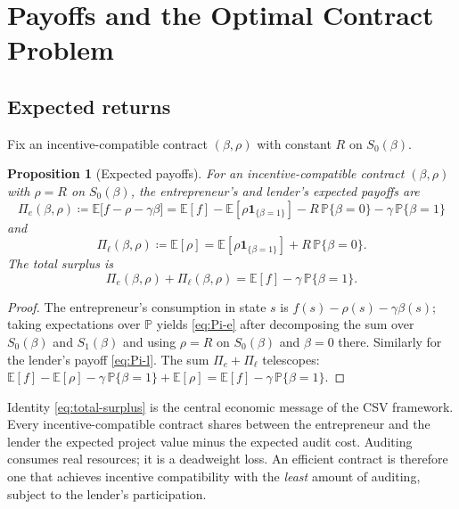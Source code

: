 \documentclass[11pt,a4paper,oneside]{book}
\def\E{\mathbb{E}}
\def\1{\mathbf{1}}
\renewcommand{\P}{\mathbb{P}}
\theoremstyle{plain}
\newtheorem{proposition}[theorem]{Proposition}
\theoremstyle{definition}
\theoremstyle{remark}
\numberwithin{equation}{chapter}
\begin{document}
\section{Payoffs and the Optimal Contract Problem}
\label{sec:GH-payoffs}

\subsection{Expected returns}

Fix an incentive-compatible contract $(\beta, \rho)$ with constant $R$ on $S_0(\beta)$.

\begin{proposition}[Expected payoffs]\label{prop:GH-payoffs}
For an incentive-compatible contract $(\beta, \rho)$ with $\rho = R$ on $S_0(\beta)$, the entrepreneur's and lender's expected payoffs are
\begin{equation}\label{eq:Pi-e}
  \Pi_e(\beta, \rho)
  \coloneqq \E\bigl[ f - \rho - \gamma \beta \bigr]
  = \E[f] - \E[\rho \1_{\{\beta = 1\}}] - R \,\P\{\beta = 0\} - \gamma \,\P\{\beta = 1\}
\end{equation}
and
\begin{equation}\label{eq:Pi-l}
  \Pi_\ell(\beta, \rho)
  \coloneqq \E[\rho]
  = \E[\rho \1_{\{\beta = 1\}}] + R \,\P\{\beta = 0\}.
\end{equation}
The total surplus is
\begin{equation}\label{eq:total-surplus}
  \Pi_e(\beta, \rho) + \Pi_\ell(\beta, \rho) = \E[f] - \gamma \, \P\{\beta = 1\}.
\end{equation}
\end{proposition}

\begin{proof}
The entrepreneur's consumption in state $s$ is $f(s) - \rho(s) - \gamma \beta(s)$; taking expectations over $\P$ yields \eqref{eq:Pi-e} after decomposing the sum over $S_0(\beta)$ and $S_1(\beta)$ and using $\rho = R$ on $S_0(\beta)$ and $\beta = 0$ there.
Similarly for the lender's payoff \eqref{eq:Pi-l}.
The sum $\Pi_e + \Pi_\ell$ telescopes: $\E[f] - \E[\rho] - \gamma \, \P\{\beta = 1\} + \E[\rho] = \E[f] - \gamma \, \P\{\beta = 1\}$.
\end{proof}

Identity \eqref{eq:total-surplus} is the central economic message of the CSV framework.
Every incentive-compatible contract shares between the entrepreneur and the lender the expected project value minus the expected audit cost.
Auditing consumes real resources; it is a deadweight loss.
An efficient contract is therefore one that achieves incentive compatibility with the \emph{least} amount of auditing, subject to the lender's participation.
\end{document}
